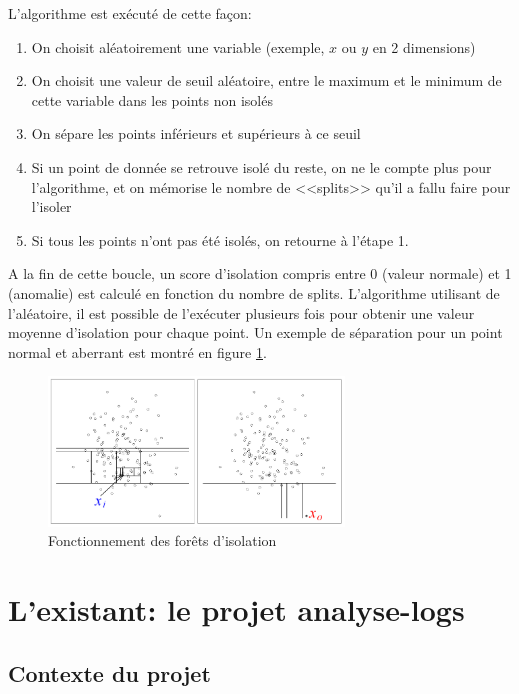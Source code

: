 \documentclass[openany, 11pt]{memoir}
\begin{document}
L'algorithme est exécuté de cette façon:

\begin{enumerate}
	\item On choisit aléatoirement une variable (exemple, $x$ ou $y$ en 2 dimensions)
	\item On choisit une valeur de seuil aléatoire, entre le maximum et le minimum de cette variable dans les points non isolés
	\item On sépare les points inférieurs et supérieurs à ce seuil
	\item Si un point de donnée se retrouve isolé du reste, on ne le compte plus pour l'algorithme, et on mémorise le nombre de <<splits>> qu'il a fallu faire pour l'isoler
	\item Si tous les points n'ont pas été isolés, on retourne à l'étape 1.
\end{enumerate}

A la fin de cette boucle, un score d'isolation compris entre 0 (valeur normale) et 1 (anomalie) est calculé en fonction du nombre de splits. L'algorithme utilisant de l'aléatoire, il est possible de l'exécuter plusieurs fois pour obtenir une valeur moyenne d'isolation pour chaque point. Un exemple de séparation pour un point normal et aberrant est montré en figure \ref{isoforest}.

\begin{figure}[ht]
	\centering
	\includegraphics[width=0.7\textwidth]{images/isoforest.png}
	\caption{Fonctionnement des forêts d'isolation}
	\label{isoforest}
\end{figure}

\newpage
\chapter{L'existant: le projet analyse-logs}

\section{Contexte du projet}
\end{document}
